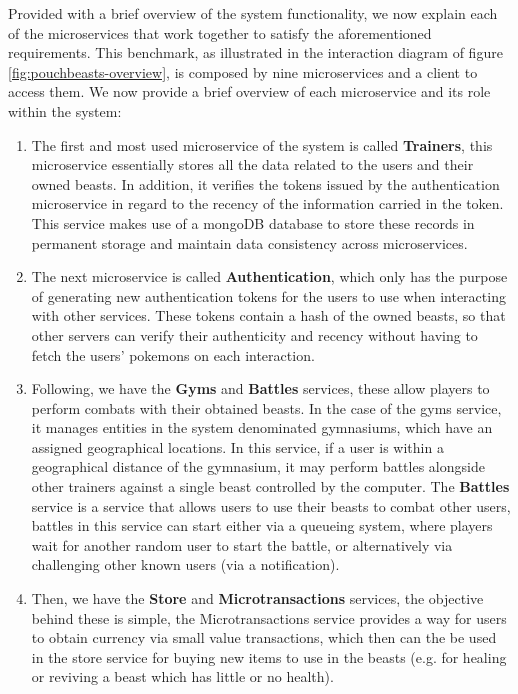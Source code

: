 Provided with a brief overview of the system functionality, we now explain each of the microservices that work together to satisfy the aforementioned requirements. This benchmark, as illustrated in the interaction diagram of figure \ref{fig:pouchbeasts-overview}, is composed by nine microservices and a client to access them. We now provide a brief overview of each microservice and its role within the system:

\begin{enumerate}
    \item The first and most used microservice of the system is called \textbf{Trainers}, this microservice essentially stores all the data related to the users and their owned beasts. In addition, it verifies the tokens issued by the authentication microservice in regard to the recency of the information carried in the token. This service makes use of a mongoDB database to store these records in permanent storage and maintain data consistency across microservices.
    
    \item The next microservice is called \textbf{Authentication}, which only has the purpose of generating new authentication tokens for the users to use when interacting with other services. These tokens contain a hash of the owned beasts, so that other servers can verify their authenticity and recency without having to fetch the users' pokemons on each interaction.

    \item Following, we have the \textbf{Gyms} and \textbf{Battles} services, these allow players to perform combats with their obtained beasts. In the case of the gyms service, it manages entities in the system denominated gymnasiums, which have an assigned geographical locations. In this service, if a user is within a geographical distance of the gymnasium, it may perform battles alongside other trainers against a single beast controlled by the computer. The \textbf{Battles} service is a service that allows users to use their beasts to combat other users, battles in this service can start either via a queueing system, where players wait for another random user to start the battle, or alternatively via challenging other known users (via a notification).
    
    \item Then, we have the \textbf{Store} and \textbf{Microtransactions} services, the objective behind these is simple, the Microtransactions service provides a way for users to obtain currency via small value transactions, which then can the be used in the store service for buying new items to use in the beasts (e.g. for healing or reviving a beast which has little or no health).


\end{enumerate}
